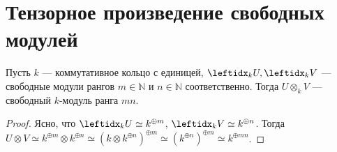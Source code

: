 \section{Тензорное произведение свободных модулей}

\begin{thm*}
    Пусть $k$ --- коммутативное кольцо с единицей, $\lsub{k}{U}, \lsub{k}{V}$ --- свободные модули рангов $m \in \mathbb{N}$ и $n \in \mathbb{N}$ соответственно. Тогда $U \otimes_k V$ --- свободный $k$-модуль ранга $mn$.
\end{thm*}

\begin{proof}
    Ясно, что $\lsub{k}{U} \simeq k^{\oplus m}$, $\lsub{k}{V} \simeq k^{\oplus n}$. Тогда $U \otimes V \simeq k^{\oplus m} \otimes k^{\oplus n} \simeq (k \otimes k^{\oplus n})^{\oplus m} \simeq (k^{\oplus n})^{\oplus m} \simeq k^{\oplus mn}$.
\end{proof}